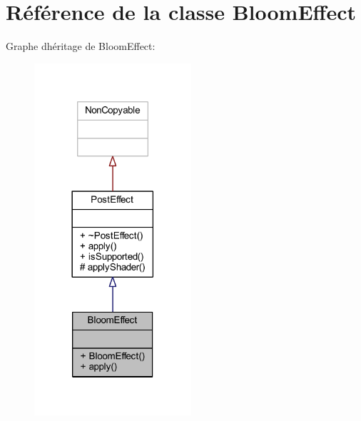 \hypertarget{class_bloom_effect}{}\section{Référence de la classe Bloom\+Effect}
\label{class_bloom_effect}


Graphe d\textquotesingle{}héritage de Bloom\+Effect\+:\nopagebreak
\begin{figure}[H]
\begin{center}
\leavevmode
\includegraphics[width=165pt]{class_bloom_effect__inherit__graph}
\end{center}
\end{figure}


